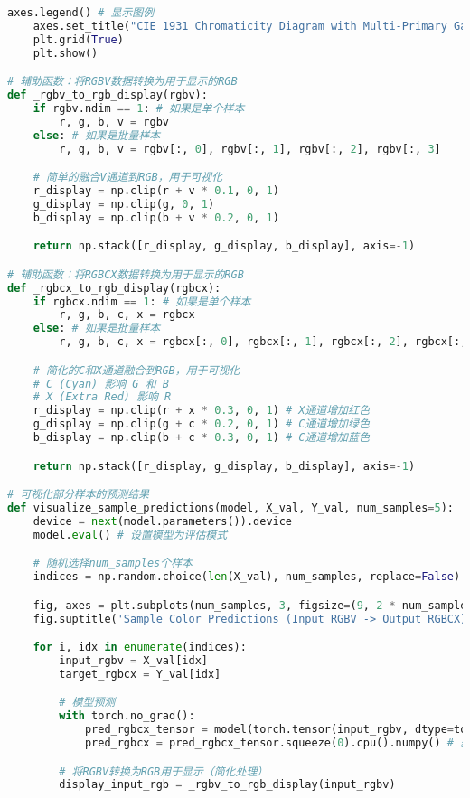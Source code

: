 \begin{lstlisting}[language=Python]
    axes.legend() # 显示图例
    axes.set_title("CIE 1931 Chromaticity Diagram with Multi-Primary Gamuts")
    plt.grid(True)
    plt.show()

# 辅助函数：将RGBV数据转换为用于显示的RGB
def _rgbv_to_rgb_display(rgbv):
    if rgbv.ndim == 1: # 如果是单个样本
        r, g, b, v = rgbv
    else: # 如果是批量样本
        r, g, b, v = rgbv[:, 0], rgbv[:, 1], rgbv[:, 2], rgbv[:, 3]

    # 简单的融合V通道到RGB，用于可视化
    r_display = np.clip(r + v * 0.1, 0, 1)
    g_display = np.clip(g, 0, 1)
    b_display = np.clip(b + v * 0.2, 0, 1)

    return np.stack([r_display, g_display, b_display], axis=-1)

# 辅助函数：将RGBCX数据转换为用于显示的RGB
def _rgbcx_to_rgb_display(rgbcx):
    if rgbcx.ndim == 1: # 如果是单个样本
        r, g, b, c, x = rgbcx
    else: # 如果是批量样本
        r, g, b, c, x = rgbcx[:, 0], rgbcx[:, 1], rgbcx[:, 2], rgbcx[:, 3], rgbcx[:, 4]

    # 简化的C和X通道融合到RGB，用于可视化
    # C (Cyan) 影响 G 和 B
    # X (Extra Red) 影响 R
    r_display = np.clip(r + x * 0.3, 0, 1) # X通道增加红色
    g_display = np.clip(g + c * 0.2, 0, 1) # C通道增加绿色
    b_display = np.clip(b + c * 0.3, 0, 1) # C通道增加蓝色

    return np.stack([r_display, g_display, b_display], axis=-1)

# 可视化部分样本的预测结果
def visualize_sample_predictions(model, X_val, Y_val, num_samples=5):
    device = next(model.parameters()).device
    model.eval() # 设置模型为评估模式

    # 随机选择num_samples个样本
    indices = np.random.choice(len(X_val), num_samples, replace=False)

    fig, axes = plt.subplots(num_samples, 3, figsize=(9, 2 * num_samples))
    fig.suptitle('Sample Color Predictions (Input RGBV -> Output RGBCX)', fontsize=16)

    for i, idx in enumerate(indices):
        input_rgbv = X_val[idx]
        target_rgbcx = Y_val[idx]

        # 模型预测
        with torch.no_grad():
            pred_rgbcx_tensor = model(torch.tensor(input_rgbv, dtype=torch.float32, device=device).unsqueeze(0))
            pred_rgbcx = pred_rgbcx_tensor.squeeze(0).cpu().numpy() # 获取预测结果并转为NumPy数组

        # 将RGBV转换为RGB用于显示（简化处理）
        display_input_rgb = _rgbv_to_rgb_display(input_rgbv)


\end{lstlisting}
